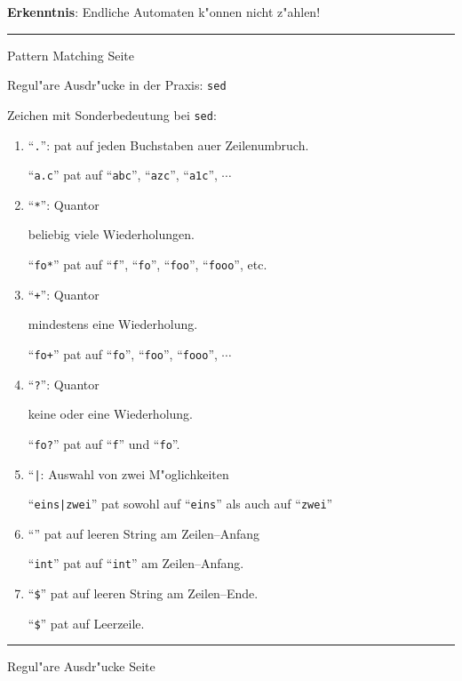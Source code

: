 \begin{slide}{}
\textbf{Erkenntnis}: Endliche Automaten k"onnen nicht z"ahlen!



\vspace*{\fill}
\tiny \addtocounter{mypage}{1}
\rule{17cm}{1mm}
Pattern Matching \hspace*{\fill} Seite 
\end{slide}


\begin{slide}{}
\normalsize
\begin{center}
Regul"are Ausdr"ucke in der Praxis: \texttt{sed}
\end{center}

\footnotesize
Zeichen mit Sonderbedeutung bei \texttt{sed}:
\begin{enumerate}
\item ``\texttt{.}'': pa\3t auf jeden Buchstaben au\3er Zeilenumbruch.


      ``\texttt{a.c}'' pa\3t auf 
      ``\texttt{abc}'', ``\texttt{azc}'', ``\texttt{a1c}'', $\cdots$
\item ``\texttt{*}'': Quantor

      beliebig viele Wiederholungen. 
      
      ``\texttt{fo*}'' pa\3t auf 
      ``\texttt{f}'', 
      ``\texttt{fo}'', 
      ``\texttt{foo}'', 
      ``\texttt{fooo}'', etc.
\item ``\texttt{+}'': Quantor

      mindestens eine Wiederholung. 

      ``\texttt{fo+}'' pa\3t auf 
      ``\texttt{fo}'', 
      ``\texttt{foo}'', 
      ``\texttt{fooo}'', $\cdots$
\item ``\texttt{?}'': Quantor

      keine oder eine Wiederholung. 

      ``\texttt{fo?}'' pa\3t auf ``\texttt{f}'' und ``\texttt{fo}''.
\item ``\texttt{|}: Auswahl von zwei M"oglichkeiten


     ``\texttt{eins|zwei}'' pa\3t sowohl auf ``\texttt{eins}'' als auch auf
     ``\texttt{zwei}''
\item ``\texttt{}'' pa\3t auf leeren String am Zeilen--Anfang

     ``\texttt{int}'' pa\3t auf ``\texttt{int}'' am Zeilen--Anfang.
\item ``\texttt{\$}'' %
     pa\3t auf leeren String am Zeilen--Ende.

     ``\texttt{\$}'' %
     pa\3t auf Leerzeile.
\end{enumerate}

\setcounter{page}{1}
\vspace*{\fill}
\tiny \addtocounter{mypage}{1}
\rule{17cm}{1mm}
Regul"are Ausdr"ucke  \hspace*{\fill} Seite 
\end{slide}

